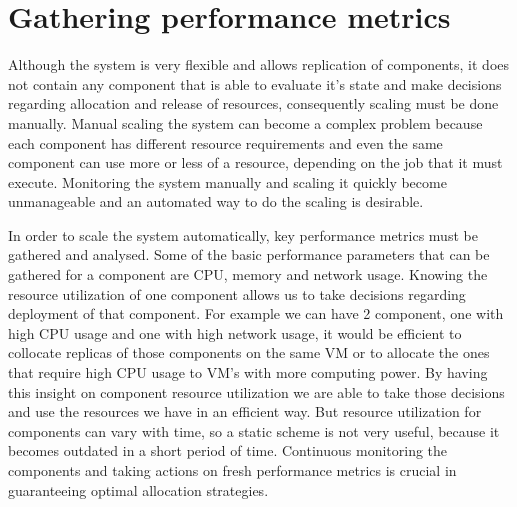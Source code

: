\section{Gathering performance metrics}
\label{sec:performance}
Although the system is very flexible and allows replication of components, it does not contain any component that is able to evaluate it's state and make decisions regarding allocation and release of resources, consequently scaling must be done manually. Manual scaling the system can become a complex problem because each component has different resource requirements and even the same component can use more or less of a resource, depending on the job that it must execute. Monitoring the system manually and scaling it quickly become unmanageable and an automated way to do the scaling is desirable. 

In order to scale the system automatically, key performance metrics must be gathered and analysed. Some of the basic performance parameters that can be gathered for a component are CPU, memory and network usage. Knowing the resource utilization of one component allows us to take decisions regarding deployment of that component. For example we can have 2 component, one with high CPU usage and one with high network usage, it would be efficient to collocate replicas of those components on the same VM or to allocate the ones that require high CPU usage to VM's with more computing power. By having this insight on component resource utilization we are able to take those decisions and use the resources  we have in an efficient way. But resource utilization for components can vary with time, so a static scheme is not very useful, because it becomes outdated in a short period of time. Continuous monitoring the components and taking actions on fresh performance metrics is crucial in guaranteeing optimal allocation strategies.


